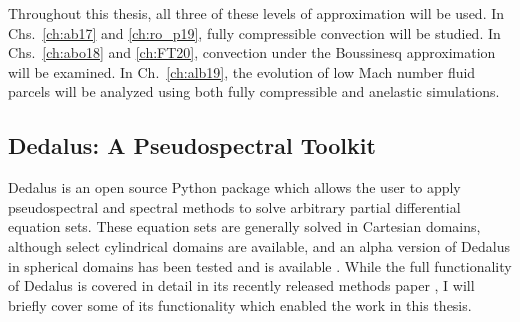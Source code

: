 Throughout this thesis, all three of these levels of approximation will be used.
In Chs.~\ref{ch:ab17} and \ref{ch:ro_p19}, fully compressible convection will be studied.
In Chs.~\ref{ch:abo18} and \ref{ch:FT20}, convection under the Boussinesq approximation will be examined.
In Ch.~\ref{ch:alb19}, the evolution of low Mach number fluid parcels will be analyzed using both fully compressible and anelastic simulations.

\subsection{Dedalus: A Pseudospectral Toolkit}
\label{sct:dedalus}
Dedalus is an open source Python package which allows the user to apply pseudospectral and spectral methods to solve arbitrary partial differential equation sets.
These equation sets are generally solved in Cartesian domains, although select cylindrical domains are available, and an alpha version of Dedalus in spherical domains has been tested and is available \citep{vasil&all2019, lecoanet&all2019}.
While the full functionality of Dedalus is covered in detail in its recently released methods paper \citep{burns&all2019}, I will briefly cover some of its functionality which enabled the work in this thesis.

